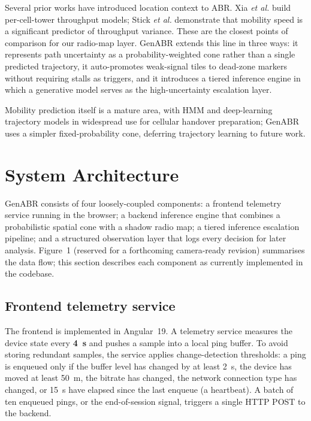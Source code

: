 \documentclass[conference]{IEEEtran}
\begin{document}
Several prior works have introduced location context to ABR. Xia
\textit{et al.} \cite{xia} build per-cell-tower throughput models; Stick
\textit{et al.} \cite{stick} demonstrate that mobility speed is a
significant predictor of throughput variance. These are the closest
points of comparison for our radio-map layer. GenABR extends this line in
three ways: it represents path uncertainty as a probability-weighted cone
rather than a single predicted trajectory, it auto-promotes weak-signal
tiles to dead-zone markers without requiring stalls as triggers, and it
introduces a tiered inference engine in which a generative model serves as
the high-uncertainty escalation layer.

Mobility prediction itself is a mature area, with HMM and deep-learning
trajectory models in widespread use for cellular handover preparation;
GenABR uses a simpler fixed-probability cone, deferring trajectory
learning to future work.

\section{System Architecture}
GenABR consists of four loosely-coupled components: a frontend telemetry
service running in the browser; a backend inference engine that combines
a probabilistic spatial cone with a shadow radio map; a tiered inference
escalation pipeline; and a structured observation layer that logs every
decision for later analysis. Figure~1 (reserved for a forthcoming
camera-ready revision) summarises the data flow; this section describes
each component as currently implemented in the codebase.

\subsection{Frontend telemetry service}
The frontend is implemented in Angular~19. A telemetry service measures
the device state every \textbf{4~s} and pushes a sample into a local ping
buffer. To avoid storing redundant samples, the service applies
change-detection thresholds: a ping is enqueued only if the buffer level
has changed by at least 2~s, the device has moved at least 50~m, the
bitrate has changed, the network connection type has changed, or 15~s
have elapsed since the last enqueue (a heartbeat). A batch of ten enqueued
pings, or the end-of-session signal, triggers a single HTTP POST to the
backend.
\end{document}
